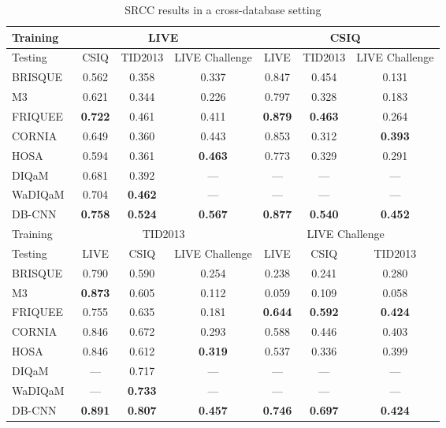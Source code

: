\documentclass[journal]{IEEEtran}
\begin{document}
\begin{table*}[t]
  \centering
  \caption{SRCC results in a cross-database setting}\label{tab:cross_validation}
  \begin{tabular}{l|ccc|ccc}
      \toprule
Training & \multicolumn{3}{c|}{LIVE~\cite{sheikh2006statistical}} & \multicolumn{3}{c}{CSIQ~\cite{larson2010most}}\\
     \hline
            Testing & CSIQ & TID2013 & LIVE Challenge & LIVE & TID2013 & LIVE Challenge \\
     \hline
            BRISQUE~\cite{mittal2012no} & 0.562 & 0.358 & 0.337 & 0.847 & 0.454 & 0.131  \\
      M3~\cite{xue2014blind}& 0.621 & 0.344 & 0.226 & 0.797 & 0.328 & 0.183 \\
FRIQUEE~\cite{ghadiyaram2017perceptual} & {\bf 0.722} & 0.461 & 0.411 & {\bf 0.879} & {\bf 0.463} & 0.264 \\
      CORNIA~\cite{ye2012unsupervised} & 0.649 & 0.360 & 0.443 & 0.853 & 0.312 & {\bf 0.393} \\
      HOSA~\cite{xu2016blind} & 0.594 & 0.361 & {\bf 0.463} & 0.773 & 0.329 & 0.291 \\
            DIQaM~\cite{bosse2016deep} & 0.681 & 0.392 & --- & --- & --- & --- \\
            WaDIQaM~\cite{bosse2016deep} & 0.704 & {\bf 0.462} & --- & --- & --- & --- \\
\hline
            DB-CNN& {\bf 0.758} & {\bf 0.524} & {\bf 0.567} & {\bf 0.877} & {\bf 0.540} & {\bf 0.452} \\
     \midrule
            Training & \multicolumn{3}{c|}{TID2013~\cite{ponomarenko2013color}} & \multicolumn{3}{c}{LIVE Challenge~\cite{ghadiyaram2016massive}}\\
     \hline
            Testing & LIVE  & CSIQ & LIVE Challenge & LIVE & CSIQ & TID2013 \\
     \hline
            BRISQUE~\cite{mittal2012no} & 0.790 & 0.590 & 0.254 & 0.238 & 0.241 & 0.280  \\
      M3~\cite{xue2014blind}& {\bf 0.873} & 0.605 & 0.112 & 0.059 & 0.109 & 0.058 \\
FRIQUEE~\cite{ghadiyaram2017perceptual} & 0.755 & 0.635 & 0.181 & {\bf 0.644} & {\bf 0.592} & {\bf 0.424} \\
      CORNIA~\cite{ye2012unsupervised} & 0.846 & 0.672 & 0.293 & 0.588 & 0.446 & 0.403 \\
      HOSA~\cite{xu2016blind} & 0.846 & 0.612 & {\bf 0.319} & 0.537 & 0.336 & 0.399 \\
            DIQaM~\cite{bosse2016deep} & --- & 0.717 & --- & --- & --- & --- \\
            WaDIQaM~\cite{bosse2016deep} & --- & {\bf 0.733} & --- & --- & --- & --- \\
\hline
            DB-CNN & {\bf 0.891} & {\bf 0.807} & {\bf 0.457} & {\bf 0.746} & {\bf 0.697} & {\bf 0.424} \\
     \bottomrule
   \end{tabular}
\end{table*}
\end{document}
